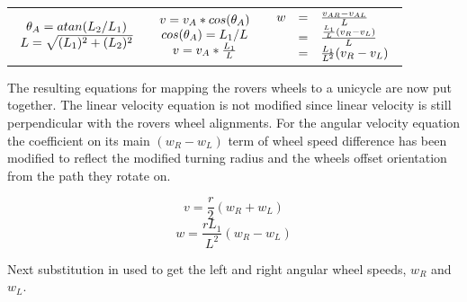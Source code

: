 \documentclass[fontsize=11pt, %
                             paper=letter, %
                             openany, %
                             captions=tableheading,
                             index=totoc,
                             hyperref]{labbook}
\begin{document}
\begin{addmargin}[0cm]{0cm}
\begin{center}
\renewcommand{\arraystretch}{1.5}
\begin{tabular}{ c | c | c }
    \begin{math}
        \begin{array}{c}
        $$\theta_{A} = atan(L_{2}/L_{1})$$\\
        $$L = \sqrt{(L_{1})^2+(L_{2})^2}$$
        \end{array}
    \end{math} &
    \begin{math}
        \begin{array}{c}
        $$v = v_{A}*cos(\theta_{A})$$\\
        $$cos(\theta_{A}) = L_{1}/L$$\\
        $$v = v_{A}*\frac{L_{1}}{L}$$
        \end{array}
    \end{math} &
    \begin{math}
        $$\begin{array}{rcl}
        w &=& \frac{v_{AR}-v_{AL}}{L}\\
          &=& \frac{\frac{L_1}{L}(v_R-v_L)}{L}\\
          &=& \frac{L_1}{L^2}(v_R-v_L)
        \end{array}$$
    \end{math} \\
\end{tabular}
\end{center}
The resulting equations for mapping the rovers wheels to a unicycle are now put together.  The linear velocity equation is not modified since linear velocity is still perpendicular with the rovers wheel alignments.  For the angular velocity equation the coefficient on its main $(w_R-w_L)$ term of wheel speed difference has been modified to reflect the modified turning radius and the wheels offset orientation from the path they rotate on.

$$v = \frac{r}{2}(w_R+w_L)$$
\vspace*{-12pt}
$$w = \frac{rL_1}{L^2}(w_R-w_L)$$
\vspace*{12pt}

Next substitution in used to get the left and right angular wheel speeds, $w_R$ and $w_L$.


\end{addmargin}
\end{document}

